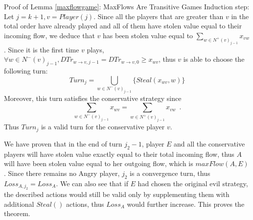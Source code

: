 \begin{sepproof}{Proof of Lemma \ref{maxflowgame}: MaxFlows Are Transitive Games}
   Induction step: Let $j = k + 1, v = Player\left(j\right)$. Since all the players that are greater than $v$ in the
   total order have already played and all of them have stolen value equal to their incoming flow, we deduce that $v$ has
   been stolen value equal to $\sum\limits_{w \in N^{+}\left(v\right)_{j-1}}x_{vw}$. Since it is the first time $v$
   plays, $\forall w \in N^{-}\left(v\right)_{j-1}, DTr_{w \rightarrow v, j-1} = DTr_{w \rightarrow v, 0} \geq x_{wv}$, thus
   $v$ is able to choose the following turn:
   \begin{equation*}
      Turn_j = \bigcup\limits_{w \in N^{-}\left(v\right)_{j-1}}\{Steal\left(x_{wv}, w\right)\}
   \end{equation*}
   Moreover, this turn satisfies the conservative strategy since
   \begin{equation*}
      \sum\limits_{w \in N^{-}\left(v\right)_{j-1}}x_{wv} = \sum\limits_{w \in N^{+}\left(v\right)_{j-1}}x_{vw} \enspace.
   \end{equation*}
   Thus $Turn_j$ is a valid turn for the conservative player $v$.

   We have proven that in the end of turn $j_2 - 1$, player $E$ and all the conservative players will have stolen value
   exactly equal to their total incoming flow, thus $A$ will have been stolen value equal to her outgoing flow, which is
   $maxFlow(A, E)$. Since there remains no Angry player, $j_2$ is a convergence turn, thus $Loss_{A, j_2} = Loss_A$. We
   can also see that if $E$ had chosen the original evil strategy, the described actions would still be valid only by
   supplementing them with additional $Steal\left(\right)$ actions, thus $Loss_A$ would further increase. This proves the
   theorem.
\end{sepproof}
